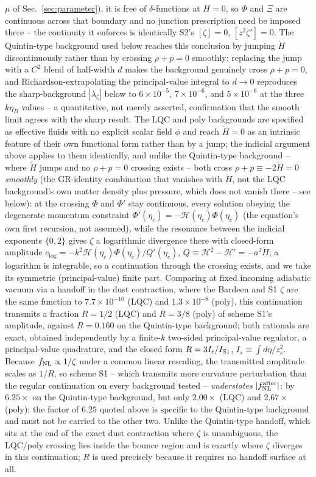 \documentclass[aps,prd,twocolumn,superscriptaddress,nofootinbib,longbibliography]{revtex4-2}
\newcommand{\fnl}{f_{\rm NL}}
\begin{document}
$\mu$ of Sec.~\ref{sec:parameter}), it is free of
$\delta$-functions at $H=0$, so $\Phi$ and $\Xi$ are continuous across
that boundary and no junction prescription need be imposed there -- the
continuity
it enforces is identically S2's $[\zeta]=0$, $[z^2\zeta']=0$. The
Quintin-type background used below reaches this conclusion by jumping
$\dot H$ discontinuously rather than by crossing $\rho+p=0$ smoothly;
replacing the jump with a $C^2$ blend of half-width $d$ makes the
background genuinely cross $\rho+p=0$, and Richardson-extrapolating the
principal-value integral to $d\to0$ reproduces the sharp-background
$|\lambda_\zeta|$ below to $6\times10^{-5}$, $7\times10^{-6}$, and
$5\times10^{-6}$ at the three $k\eta_B$ values -- a quantitative,
not merely asserted, confirmation that the smooth limit agrees with the
sharp result. The LQC and poly backgrounds are specified as effective
fluids with no explicit scalar field $\phi$ and reach $\dot H=0$ as an
intrinsic feature of their own functional form rather than by a jump;
the indicial argument above applies to them identically, and unlike the
Quintin-type background -- where $\dot H$ jumps and no $\rho+p=0$ crossing
exists -- both cross $\rho+p\equiv-2\dot H=0$ \emph{smoothly} (the
GR-identity combination that vanishes with $\dot H$, not the LQC background's
own matter density plus pressure, which does not vanish there -- see below):
at the crossing $\Phi$ and
$\Phi'$ stay continuous, every solution obeying the degenerate momentum
constraint $\Phi'(\eta_c)=-\mathcal H(\eta_c)\Phi(\eta_c)$ (the equation's
own first recursion, not assumed), while the resonance between the
indicial exponents $\{0,2\}$ gives $\zeta$ a logarithmic divergence there
with closed-form amplitude
$c_{\log}=-k^2\mathcal H(\eta_c)\Phi(\eta_c)/Q'(\eta_c)$,
$Q\equiv\mathcal H^2-\mathcal H'=-a^2\dot H$; a logarithm is integrable,
so a continuation through the crossing exists, and we take its symmetric
(principal-value) finite part. Comparing at fixed incoming adiabatic
vacuum via a handoff in the dust contraction, where the Bardeen and S1
$\zeta$ are the same function to $7.7\times10^{-10}$ (LQC) and
$1.3\times10^{-8}$ (poly), this continuation transmits a fraction
$R=1/2$ (LQC) and $R=3/8$ (poly) of scheme S1's amplitude, against
$R=0.160$ on the Quintin-type background; both rationals are exact,
obtained independently by a finite-$k$ two-sided principal-value
regulator, a principal-value quadrature, and the closed form
$R=3I_\epsilon/I_{\rm S1}$, $I_s\equiv\int d\eta/z_s^2$. Because
$\fnl\propto1/\zeta$ under a common linear rescaling, the transmitted
amplitude scales as $1/R$, so scheme S1 -- which transmits more curvature
perturbation than the regular continuation on every background tested --
\emph{understates} $|\fnl^{\rm after}|$: by $6.25\times$ on the
Quintin-type background, but only $2.00\times$ (LQC) and $2.67\times$
(poly); the factor of $6.25$ quoted above is specific to the Quintin-type
background and must not be carried to the other two. Unlike the
Quintin-type handoff, which sits at the end of the exact dust contraction
where $\zeta$ is unambiguous, the LQC/poly crossing lies inside the
bounce region and is exactly where $\zeta$ diverges in this continuation;
$R$ is used precisely because it requires no handoff surface at all.
\end{document}
